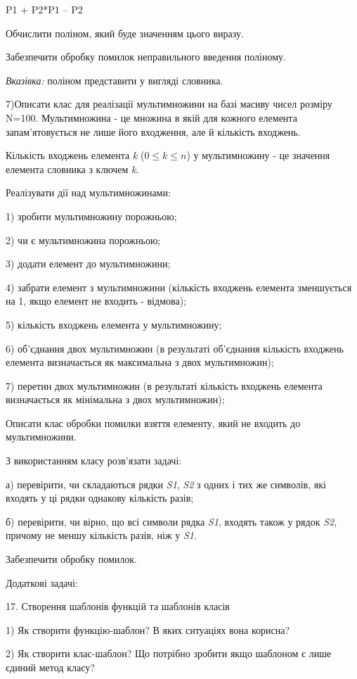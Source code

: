 \documentclass[]{article}
\begin{document}
P1 + P2*P1 -- P2

Обчислити поліном, який буде значенням цього виразу.

Забезпечити обробку помилок неправильного введення поліному.

\emph{\emph{Вказівка:}} поліном представити у вигляді словника.

7)Описати клас для реалізації мультимножини на базі масиву чисел розміру
N=100. Мультимножина - це множина в якій для кожного елемента
запам'ятовується не лише його входження, але й кількість входжень.

Кількість входжень елемента \emph{k} (\(0 \leq k \leq n\)) у
мультимножину - це значення елемента словника з ключем \emph{k}.

Реалізувати дії над мультимножинами:

1) зробити мультимножину порожньою;

2) чи є мультимножина порожньою;

3) додати елемент до мультимножини;

4) забрати елемент з мультимножини (кількість входжень елемента
зменшується на 1, якщо елемент не входить - відмова);

5) кількість входжень елемента у мультимножину;

6) об'єднання двох мультимножин (в результаті об'єднання кількість
входжень елемента визначається як максимальна з двох мультимножин);

7) перетин двох мультимножин (в результаті кількість входжень елемента
визначається як мінімальна з двох мультимножин);

Описати клас обробки помилки взяття елементу, який не входить до
мультимножини.

З використанням класу розв'язати задачі:

а) перевірити, чи складаються рядки \emph{S1}, \emph{S2} з одних і тих
же символів, які входять у ці рядки однакову кількість разів;

б) перевірити, чи вірно, що всі символи рядка \emph{S1}, входять також у
рядок \emph{S2}, причому не меншу кількість разів, ніж у \emph{S1}.

Забезпечити обробку помилок.

Додаткові задачі:

17. Створення шаблонів функцій та шаблонів класів

1) Як створити функцію-шаблон? В яких ситуаціях вона корисна?

2) Як створити клас-шаблон? Що потрібно зробити якщо шаблоном є лише
єдиний метод класу?
\end{document}

